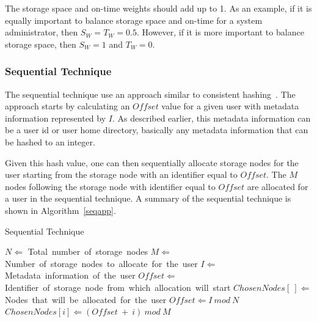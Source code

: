 \documentclass[preprint,12pt]{elsarticle}
\begin{document}
The storage space and on-time weights should add up to 1. As an example, if it is equally important
to balance storage space and on-time for a system
administrator, then $S_W=T_W=0.5$. However, if it is more important to
balance storage space, then $S_W=1$ and $T_W=0$.

\subsubsection{Sequential Technique}
\label{seqtechnique}
The sequential technique use an approach similar to consistent hashing~\cite{Karger:1997:CHR:258533.258660}.
The approach starts by calculating an $Offset$
value for a given user
with metadata information represented by $I$. As described earlier, 
this metadata information can be a user id or user home directory, basically any metadata information
that can be hashed to an integer.

Given this hash value, one can then sequentially allocate storage nodes for the user starting from
the storage node with an identifier equal to $Offset$.
The $M$ nodes following the storage node with identifier equal to $Offset$ are
allocated for a user in the sequential technique.
A summary of the sequential
technique is shown in Algorithm~\ref{seqapp}.

\begin{algorithm}[!htbp]
\caption{Sequential Technique}
\label{seqapp}
\begin{algorithmic}[1]
    \STATE $N \Leftarrow$ Total\ number\ of\ storage\ nodes
    \STATE $M \Leftarrow$ Number\ of\ storage\ nodes\ to\ allocate\ for\ the\ user
    \STATE $I \Leftarrow$ Metadata\ information\ of\ the\ user
    \STATE $Offset \Leftarrow$ Identifier\ of\ storage\ node\ from\ which\ allocation\ will\ start
    \STATE $ChosenNodes[\ ] \Leftarrow$ Nodes\ that\ will\ be\ allocated\ for\ the\ user
    \STATE $Offset \Leftarrow I\ mod\ N$
        \STATE $ChosenNodes[i] \Leftarrow (Offset\ +\ i)\ mod\ M$
    \ENDFOR
\end{algorithmic}
\end{algorithm}
\end{document}
